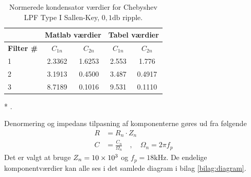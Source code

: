 \begin{table}[h!]
	\centering
	\caption{Normerede kondensator værdier for Chebyshev LPF Type I Sallen-Key, $0,1\si{\decibel}$ ripple.}
	\label{tab:sallen_key}
	\begin{threeparttable}
		\begin{tabular}{l c c c c}
			\toprule
			& \multicolumn{2}{c}{\textbf{Matlab værdier}} & \multicolumn{2}{c}{\textbf{Tabel værdier\tnote{(*)}}} \\ 
			\midrule
			\textbf{Filter \#} &
			\textbf{$C_{1n}$} 	& 
			\textbf{$C_{2n}$}  	&
			\textbf{$C_{1n}$} 		& 
			\textbf{$C_{2n}$} 	\\
			\midrule
			1 & \num{2.3362} & \num{1.6253} & \num{2.553} & \num{1.776} \\
			2 & \num{3.1913} & \num{0.4500} & \num{3.487} & \num{0.4917} \\
			3 & \num{8.7189} & \num{0.1016} & \num{9.531} & \num{0.1110} \\
			\bottomrule
		\end{tabular}
		
		\begin{tablenotes}
			\item[*] \cite[Table B-2: Chebyshev lowpass Sallen-Key filters, n=6]{sk_data_web}.
		\end{tablenotes}
	\end{threeparttable}
\end{table}

Denormering og impedans tilpasning af komponenterne gøres ud fra følgende
\begin{align}
	R &= R_n \cdot Z_n \\
	C &= \frac{C_n}{\Omega_n} \quad , \quad \Omega_n = 2\pi f_p 
\end{align} 
Det er valgt at bruge $Z_n = \num{10E3}$ og $f_p = 18\si{\kilo\hertz}$.
De endelige komponentværdier kan alle ses i det samlede diagram i bilag \ref{bilag:diagram}.